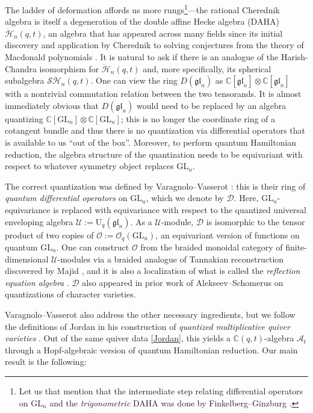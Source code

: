 \documentclass[JEP,XML,SOM,Unicode,published]{cedram}
\newcommand{\GL}{\mathrm{GL}}
\newcommand{\rU}{\mathrm{U}}
\theoremstyle{definition}
\newcommand{\CC}{\mathbb{C}}
\newcommand{\OO}{\mathcal{O}}
\newcommand{\UU}{\mathcal{U}}
\newcommand{\DD}{\mathcal{D}}
\newcommand{\SHH}{\mathcal{S}\ddot{\mathcal{H}}}
\newcommand{\HH}{\ddot{\mathcal{H}}}
\begin{document}
The ladder of deformation affords us more rungs\footnote{Let us that mention that the intermediate step relating differential operators on $\GL_n$ and the \textit{trigonometric} DAHA was done by Finkelberg--Ginzburg \cite{FGCurve}.}---the rational Cherednik algebra is itself a degeneration of the double affine Hecke algebra (DAHA) $\HH_n(q,t)$, an algebra that has appeared across many fields since its initial discovery and application by Cherednik to solving conjectures from the theory of Macdonald polynomials \cite{ChereAnnals}.
It is natural to ask if there is an analogue of the Harish-Chandra isomorphism for $\HH_n(q,t)$ and, more specifically, its spherical subalgebra $\SHH_n(q,t)$.
One can view the ring $D(\mathfrak{gl}_n)$ as $\CC[\mathfrak{gl}_n]\otimes\CC[\mathfrak{gl}_n]$ with a nontrivial commutation relation between the two tensorands.
It is almost immediately obvious that $D(\mathfrak{gl}_n)$ would need to be replaced by an algebra quantizing $\CC[\GL_n]\otimes\CC[\GL_n]$; this is no longer the coordinate ring of a cotangent bundle and thus there is no quantization via differential operators that is available to us ``out of the box''.
Moreover, to perform quantum Hamiltonian reduction, the algebra structure of the quantization needs to be equivariant with respect to whatever symmetry object replaces $\GL_n$.

The correct quantization was defined by Varagnolo--Vasserot \cite{VarVassRoot}: this is their ring of \textit{quantum differential operators} on $\GL_n$, which we denote by $\DD$.
Here, $\GL_n$-equivariance is replaced with equivariance with respect to the quantized universal enveloping algebra $\UU:=\rU_q(\mathfrak{gl}_n)$.
As a $\UU$-module, $\DD$ is isomorphic to the tensor product of two copies of $\OO:=\OO_q(\GL_n)$, an equivariant version of functions on quantum $\GL_n$.
One can construct $\OO$ from the braided monoidal category of finite-dimensional $\UU$-modules via a braided analogue of Tannakian reconstruction discovered by Majid \cite{MajidBraided}, and it is also a localization of what is called the \textit{reflection equation algebra} \cite{DonMudRET}.
$\DD$ also appeared in prior work of Alekseev--Schomerus \cite{AlekScho} on quantizations of character varieties.

Varagnolo--Vasserot also address the other necessary ingredients, but we follow the definitions of Jordan in his construction of \textit{quantized multiplicative quiver varieties} \cite{JordanMult}.
Out of the same quiver data \eqref{Jordan}, this yields a $\CC(q,t)$-algebra $\mathcal{A}_t$ through a Hopf-algebraic version of quantum Hamiltonian reduction.
Our main result is the following:
\end{document}
